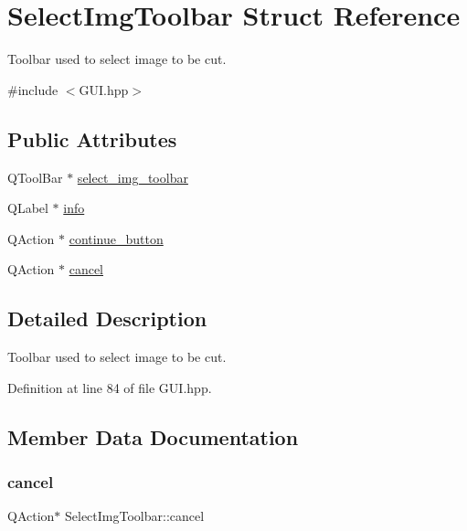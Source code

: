 \hypertarget{structSelectImgToolbar}{}\section{Select\+Img\+Toolbar Struct Reference}
\label{structSelectImgToolbar}


Toolbar used to select image to be cut.  




{\ttfamily \#include $<$G\+U\+I.\+hpp$>$}

\subsection*{Public Attributes}
\begin{DoxyCompactItemize}
\item 
Q\+Tool\+Bar $\ast$ \mbox{\hyperlink{structSelectImgToolbar_a779bc326cf08c9fbcd1ffebb43a664eb}{select\+\_\+img\+\_\+toolbar}}
\item 
Q\+Label $\ast$ \mbox{\hyperlink{structSelectImgToolbar_a3cf6ac92fbe60877873c89939217e1de}{info}}
\item 
Q\+Action $\ast$ \mbox{\hyperlink{structSelectImgToolbar_a82569764f9d7e13b406a668e9e50290a}{continue\+\_\+button}}
\item 
Q\+Action $\ast$ \mbox{\hyperlink{structSelectImgToolbar_a0b17a222dff0441c0f10509315ce9052}{cancel}}
\end{DoxyCompactItemize}


\subsection{Detailed Description}
Toolbar used to select image to be cut. 

Definition at line 84 of file G\+U\+I.\+hpp.



\subsection{Member Data Documentation}
\mbox{\label{structSelectImgToolbar_a0b17a222dff0441c0f10509315ce9052}} 
\subsubsection{\texorpdfstring{cancel}{cancel}}
{\footnotesize\ttfamily Q\+Action$\ast$ Select\+Img\+Toolbar\+::cancel}

